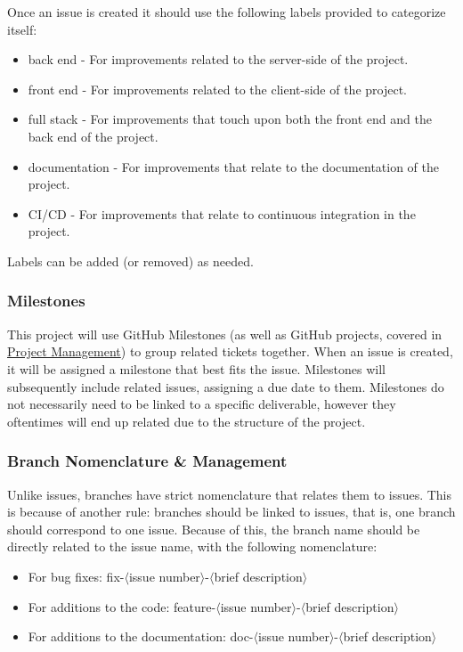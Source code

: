 \documentclass{article}
\begin{document}
Once an issue is created it should use the following labels provided to categorize itself:
\begin{itemize}
    \item back end - For improvements related to the server-side of the project.
    \item front end - For improvements related to the client-side of the project.
    \item full stack - For improvements that touch upon both the front end and the back end of the project.
    \item documentation - For improvements that relate to the documentation of the project.
    \item CI/CD - For improvements that relate to continuous integration in the project.
\end{itemize}

Labels can be added (or removed) as needed.

\subsubsection{Milestones}

This project will use GitHub Milestones (as well as GitHub projects, covered in \hyperref[sec:projectmngment]{Project Management}) to group related tickets together. When an issue is created, it will be assigned a milestone that best fits the issue. Milestones will subsequently include related issues, assigning a due date to them. Milestones do not necessarily need to be linked to a specific deliverable, however they oftentimes will end up related due to the structure of the project.

\subsubsection{Branch Nomenclature \& Management}

Unlike issues, branches have strict nomenclature that relates them to issues. This is because of another rule: branches should be linked to issues, that is, one branch should correspond to one issue. Because of this, the branch name should be directly related to the issue name, with the following nomenclature:

\begin{itemize}
    \item For bug fixes: fix-$\langle$issue number$\rangle$-$\langle$brief description$\rangle$
    \item For additions to the code: feature-$\langle$issue number$\rangle$-$\langle$brief description$\rangle$
    \item For additions to the documentation: doc-$\langle$issue number$\rangle$-$\langle$brief description$\rangle$
\end{itemize}
\end{document}
